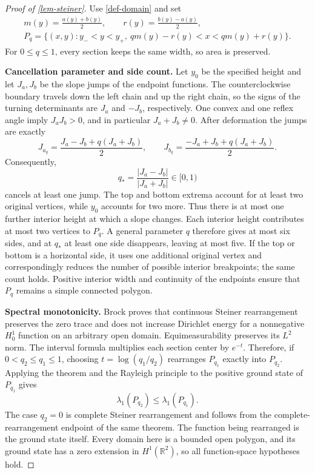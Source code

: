 \documentclass[11pt,a4paper]{article}
\theoremstyle{proofmanuscript}
\begin{document}
\begin{proof}[Proof of \ref{lem-steiner}]

Use \ref{def-domain} and set \[
\begin{gathered}
m(y)=\frac{a(y)+b(y)}2,\qquad r(y)=\frac{b(y)-a(y)}2,\\
P_q=\{(x,y):y_-<y<y_+,\ qm(y)-r(y)<x<qm(y)+r(y)\}.
\end{gathered}
\tag{G.3.3}
\] For \(0\le q\le1\), every section keeps the same width, so area is preserved.

\textbf{Cancellation parameter and side count.} Let \(y_0\) be the specified height and let \(J_a,J_b\) be the slope jumps of the endpoint functions. The counterclockwise boundary travels down the left chain and up the right chain, so the signs of the turning determinants are \(J_a\) and \(-J_b\), respectively. One convex and one reflex angle imply \(J_aJ_b>0\), and in particular \(J_a+J_b\ne0\). After deformation the jumps are exactly \[
J_{a_q}=\frac{J_a-J_b+q(J_a+J_b)}2,
\qquad
J_{b_q}=\frac{-J_a+J_b+q(J_a+J_b)}2.
\tag{G.3.4}
\] Consequently, \[
q_*=\frac{|J_a-J_b|}{|J_a+J_b|}\in[0,1)
\tag{G.3.5}
\] cancels at least one jump. The top and bottom extrema account for at least two original vertices, while \(y_0\) accounts for two more. Thus there is at most one further interior height at which a slope changes. Each interior height contributes at most two vertices to \(P_q\). A general parameter \(q\) therefore gives at most six sides, and at \(q_*\) at least one side disappears, leaving at most five. If the top or bottom is a horizontal side, it uses one additional original vertex and correspondingly reduces the number of possible interior breakpoints; the same count holds. Positive interior width and continuity of the endpoints ensure that \(P_q\) remains a simple connected polygon.

\textbf{Spectral monotonicity.} Brock \cite{nc:brock2000} proves that continuous Steiner rearrangement preserves the zero trace and does not increase Dirichlet energy for a nonnegative \(H_0^1\) function on an arbitrary open domain. Equimeasurability preserves its \(L^2\) norm. The interval formula multiplies each section center by \(e^{-t}\). Therefore, if \(0<q_2\le q_1\le1\), choosing \(t=\log(q_1/q_2)\) rearranges \(P_{q_1}\) exactly into \(P_{q_2}\). Applying the theorem and the Rayleigh principle to the positive ground state of \(P_{q_1}\) gives \[
\lambda_1(P_{q_2})\le\lambda_1(P_{q_1}).
\] The case \(q_2=0\) is complete Steiner rearrangement and follows from the complete-rearrangement endpoint of the same theorem. The function being rearranged is the ground state itself. Every domain here is a bounded open polygon, and its ground state has a zero extension in \(H^1(\mathbb R^2)\), so all function-space hypotheses hold.


\end{proof}
\end{document}
